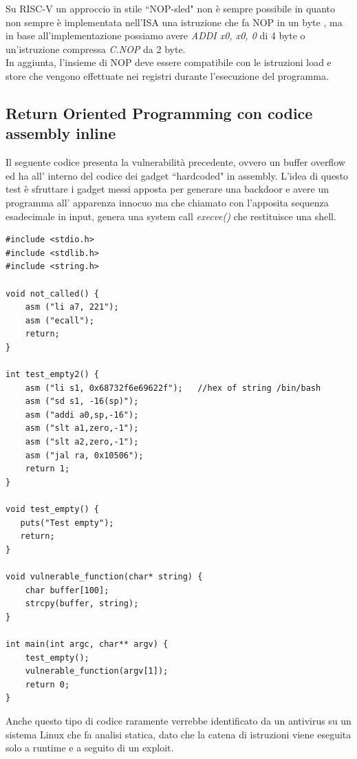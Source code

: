 \FloatBarrier
\vspace{1cm}
Su RISC-V un approccio in stile ``NOP-sled" non è sempre possibile in quanto non sempre è implementata nell'ISA una istruzione che fa NOP in un byte \cite{NOPArch}, ma in base all'implementazione possiamo avere \textit{ADDI x0, x0, 0} di 4 byte o un'istruzione compressa \textit{C.NOP} da 2 byte.\\
In aggiunta, l'insieme di NOP deve essere compatibile con le istruzioni load e store che vengono effettuate nei registri durante l'esecuzione del programma.
\subsection*{Return Oriented Programming con codice assembly inline}
Il seguente codice \cite{ctftime} presenta la vulnerabilità precedente, ovvero un buffer overflow ed ha all' interno del codice dei gadget ``hardcoded" in assembly.  L'idea di questo test è sfruttare i gadget messi apposta per generare una backdoor e avere un programma all' apparenza innocuo ma che chiamato con l'apposita sequenza esadecimale in input, genera una system call \textit{execve()} che restituisce una shell. 
\begin{verbatim}
#include <stdio.h>
#include <stdlib.h>
#include <string.h>

void not_called() {
    asm ("li a7, 221");
    asm ("ecall");
    return;
}

int test_empty2() {
    asm ("li s1, 0x68732f6e69622f");   //hex of string /bin/bash
    asm ("sd s1, -16(sp)");
    asm ("addi a0,sp,-16");
    asm ("slt a1,zero,-1");
    asm ("slt a2,zero,-1");
    asm ("jal ra, 0x10506");
    return 1;
}

void test_empty() {
   puts("Test empty");
   return;
}

void vulnerable_function(char* string) {
    char buffer[100];
    strcpy(buffer, string);
}

int main(int argc, char** argv) {
    test_empty();
    vulnerable_function(argv[1]);
    return 0;
}
\end{verbatim}
Anche questo tipo di codice raramente verrebbe identificato da un antivirus su un sistema Linux che fa analisi statica, dato che la catena di istruzioni viene eseguita solo a runtime e a seguito di un exploit.\\
\newline
